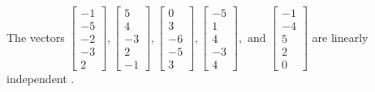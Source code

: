 \begin{exercise}
\begin{exerciseStatement}
  \end{exerciseStatement}
  \begin{exerciseAnswer}
   The vectors \(\left[\begin{array}{r}
-1 \\
-5 \\
-2 \\
-3 \\
2
\end{array}\right] , \left[\begin{array}{r}
5 \\
4 \\
-3 \\
2 \\
-1
\end{array}\right] , \left[\begin{array}{r}
0 \\
3 \\
-6 \\
-5 \\
3
\end{array}\right] , \left[\begin{array}{r}
-5 \\
1 \\
4 \\
-3 \\
4
\end{array}\right] , \text{ and } \left[\begin{array}{r}
-1 \\
-4 \\
5 \\
2 \\
0
\end{array}\right]\) are 
  	 linearly independent  .
  


  \end{exerciseAnswer}
\end{exercise}
